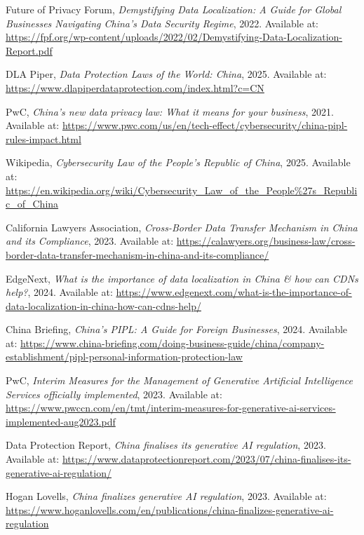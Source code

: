 \documentclass[11点, A4纸, 单面]{article}
\begin{document}
\begin{thebibliography}{99}
    Future of Privacy Forum, \textit{Demystifying Data Localization: A Guide for Global Businesses Navigating China's Data Security Regime}, 2022. Available at: \url{https://fpf.org/wp-content/uploads/2022/02/Demystifying-Data-Localization-Report.pdf}

    DLA Piper, \textit{Data Protection Laws of the World: China}, 2025. Available at: \url{https://www.dlapiperdataprotection.com/index.html?c=CN}

    PwC, \textit{China's new data privacy law: What it means for your business}, 2021. Available at: \url{https://www.pwc.com/us/en/tech-effect/cybersecurity/china-pipl-rules-impact.html}

    Wikipedia, \textit{Cybersecurity Law of the People's Republic of China}, 2025. Available at: \url{https://en.wikipedia.org/wiki/Cybersecurity_Law_of_the_People%27s_Republic_of_China}

    California Lawyers Association, \textit{Cross-Border Data Transfer Mechanism in China and its Compliance}, 2023. Available at: \url{https://calawyers.org/business-law/cross-border-data-transfer-mechanism-in-china-and-its-compliance/}

    EdgeNext, \textit{What is the importance of data localization in China \& how can CDNs help?}, 2024. Available at: \url{https://www.edgenext.com/what-is-the-importance-of-data-localization-in-china-how-can-cdns-help/}

    China Briefing, \textit{China's PIPL: A Guide for Foreign Businesses}, 2024. Available at: \url{https://www.china-briefing.com/doing-business-guide/china/company-establishment/pipl-personal-information-protection-law}

    PwC, \textit{Interim Measures for the Management of Generative Artificial Intelligence Services officially implemented}, 2023. Available at: \url{https://www.pwccn.com/en/tmt/interim-measures-for-generative-ai-services-implemented-aug2023.pdf}

    Data Protection Report, \textit{China finalises its generative AI regulation}, 2023. Available at: \url{https://www.dataprotectionreport.com/2023/07/china-finalises-its-generative-ai-regulation/}

    Hogan Lovells, \textit{China finalizes generative AI regulation}, 2023. Available at: \url{https://www.hoganlovells.com/en/publications/china-finalizes-generative-ai-regulation}

\end{thebibliography}
\end{document}
